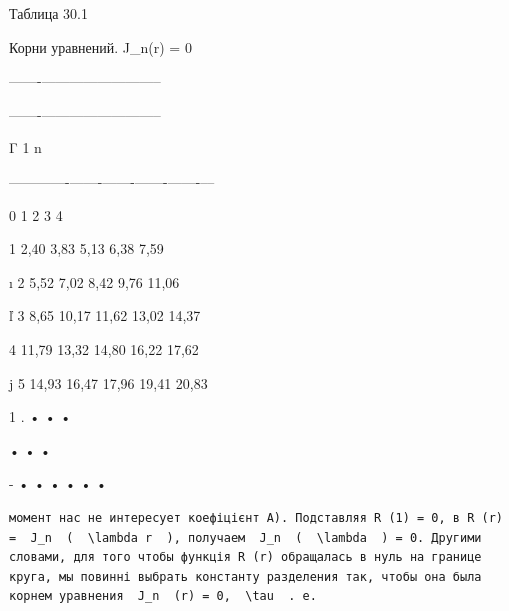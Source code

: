 \documentclass[
  ukrainian,
]{article}
\begin{document}
Таблица 30.1

Корни \textbar{} уравнений. \textbar{} J\_n(r) = 0 \textbar{}

\textbar-------\textbar------------\textbar--------------\textbar{}

\textbar-------\textbar------------\textbar--------------\textbar{}

Γ \textbar{} 1 \textbar{} n \textbar{} \textbar{} \textbar{} \textbar{}
\textbar{} \textbar{} \textbar{}

\textbar---\textbar---\textbar-------\textbar-------\textbar-------\textbar-------\textbar-------\textbar--\textbar--\textbar{}

\textbar{} \textbar{} 0 \textbar{} 1 \textbar{} 2 \textbar{} 3
\textbar{} 4 \textbar{} \textbar{} \textbar{}

\textbar{} 1 \textbar{} 2,40 \textbar{} 3,83 \textbar{} 5,13 \textbar{}
6,38 \textbar{} 7,59 \textbar{} \textbar{} \textbar{}

ı \textbar{} 2 \textbar{} 5,52 \textbar{} 7,02 \textbar{} 8,42
\textbar{} 9,76 \textbar{} 11,06 \textbar{} \textbar{} \textbar{}

ľ \textbar{} 3 \textbar{} 8,65 \textbar{} 10,17 \textbar{} 11,62
\textbar{} 13,02 \textbar{} 14,37 \textbar{} \textbar{} \textbar{}

\textbar{} 4 \textbar{} 11,79 \textbar{} 13,32 \textbar{} 14,80
\textbar{} 16,22 \textbar{} 17,62 \textbar{} \textbar{} \textbar{}

j \textbar{} 5 \textbar{} 14,93 \textbar{} 16,47 \textbar{} 17,96
\textbar{} 19,41 \textbar{} 20,83 \textbar{} \textbar{} \textbar{}

1 \textbar{} . \textbar{} • \textbar{} \textbar{} • \textbar{}
\textbar{} • \textbar{} \textbar{} \textbar{}

\textbar{} \textbar{} \textbar{} • \textbar{} \textbar{} • \textbar{} •
\textbar{} \textbar{} \textbar{}

- \textbar{} • \textbar{} • \textbar{} • \textbar{} • \textbar{} •
\textbar{} • \textbar{} \textbar{} \textbar{}

\begin{verbatim}
момент нас не интересует коефіцієнт A). Подставляя R (1) = 0, в R (r) =  J_n  (  \lambda r  ), получаем  J_n  (  \lambda  ) = 0. Другими словами, для того чтобы функція R (r) обращалась в нуль на границе круга, мы повинні выбрать константу разделения так, чтобы она была корнем уравнения  J_n  (r) = 0,  \tau  . e.
\end{verbatim}
\end{document}
